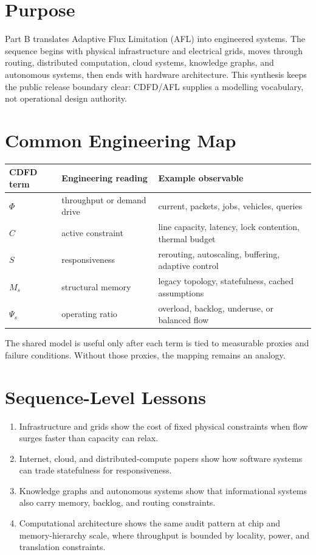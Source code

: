 \documentclass[12pt,a4paper]{article}
\begin{document}
\section{Purpose}

Part B translates Adaptive Flux Limitation (AFL) into engineered systems. The
sequence begins with physical infrastructure and electrical grids, moves
through routing, distributed computation, cloud systems, knowledge graphs, and
autonomous systems, then ends with hardware architecture. This synthesis keeps
the public release boundary clear: CDFD/AFL supplies a modelling vocabulary, not
operational design authority.

\section{Common Engineering Map}

\begin{table}[h]
\centering
\begin{tabularx}{\textwidth}{@{}lXX@{}}
\toprule
CDFD term & Engineering reading & Example observable \\
\midrule
$\Phi$ & throughput or demand drive & current, packets, jobs, vehicles, queries \\
$C$ & active constraint & line capacity, latency, lock contention, thermal budget \\
$S$ & responsiveness & rerouting, autoscaling, buffering, adaptive control \\
$M_s$ & structural memory & legacy topology, statefulness, cached assumptions \\
$\Psi_s$ & operating ratio & overload, backlog, underuse, or balanced flow \\
\bottomrule
\end{tabularx}
\end{table}

The shared model is useful only after each term is tied to measurable proxies
and failure conditions. Without those proxies, the mapping remains an analogy.

\section{Sequence-Level Lessons}

\begin{enumerate}
    \item Infrastructure and grids show the cost of fixed physical constraints
    when flow surges faster than capacity can relax.
    \item Internet, cloud, and distributed-compute papers show how software
    systems can trade statefulness for responsiveness.
    \item Knowledge graphs and autonomous systems show that informational
    systems also carry memory, backlog, and routing constraints.
    \item Computational architecture shows the same audit pattern at chip and
    memory-hierarchy scale, where throughput is bounded by locality, power, and
    translation constraints.
\end{enumerate}
\end{document}
